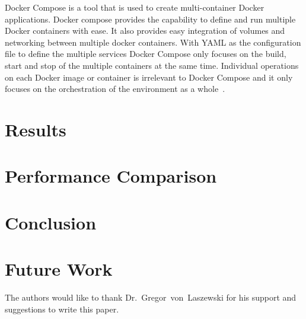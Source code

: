 Docker Compose is a tool that is used to create multi-container Docker 
applications. Docker compose provides the capability to define and run 
multiple Docker containers with ease. It also provides easy integration of 
volumes and networking between multiple docker containers. With YAML as the 
configuration file to define the multiple services Docker Compose only focuses 
on the build, start and stop of the multiple containers at the same time. 
Individual operations on each Docker image or container is irrelevant to 
Docker Compose and it only focuses on the orchestration of the environment as 
a whole~\cite{hid-sp18-416-www-docker-compose-blog}. 

\section{Results}

\section{Performance Comparison}

\section{Conclusion}

\section{Future Work}

\begin{acks}

  The authors would like to thank Dr.~Gregor~von~Laszewski for his
  support and suggestions to write this paper.

\end{acks}


 


